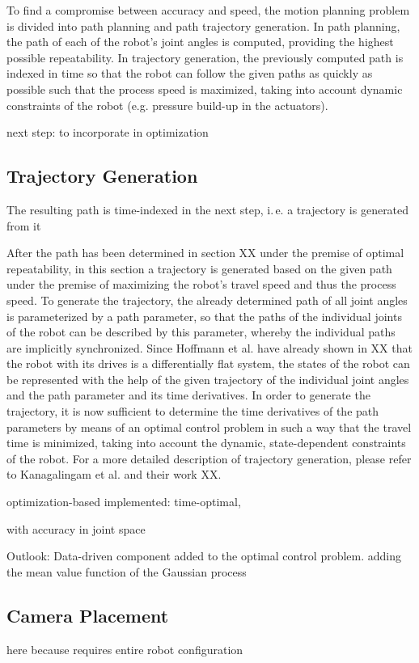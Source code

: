 \documentclass[5p,times,procedia]{elsarticle}
\begin{document}
To find a compromise between accuracy and speed, the motion planning problem is divided into path planning and path trajectory generation. In path planning, the path of each of the robot’s joint angles is computed, providing the highest possible repeatability. In trajectory generation, the previously computed path is indexed in time so that the robot can follow the given paths as quickly as possible such that the process speed is maximized, taking into account dynamic constraints of the robot (e.g. pressure build-up in the actuators).


next step: to incorporate in optimization

\subsection{Trajectory Generation}
The resulting path is time-indexed in the next step, i.\,e. a trajectory is generated from it

After the path has been determined in section XX under the premise of optimal repeatability, in this section a trajectory is generated based on the given path under the premise of maximizing the robot’s travel speed and thus the process speed. To generate the trajectory, the already determined path of all joint angles is parameterized by a path parameter, so that the paths of the individual joints of the robot can be described by this parameter, whereby the individual paths are implicitly synchronized. Since Hoffmann et al. have already shown in XX that the robot with its drives is a differentially flat system, the states of the robot can be represented with the help of the given trajectory of the individual joint angles and the path parameter and its time derivatives. In order to generate the trajectory, it is now sufficient to determine the time derivatives of the path parameters by means of an optimal control problem in such a way that the travel time is minimized, taking into account the dynamic, state-dependent constraints of the robot.  For a more detailed description of trajectory generation, please refer to Kanagalingam et al. and their work XX.  


optimization-based
implemented: time-optimal, 

with accuracy in joint space

Outlook: Data-driven component added to the optimal control problem.
adding the mean value function of the Gaussian process

\subsection{Camera Placement}
here because requires entire robot configuration
\end{document}
